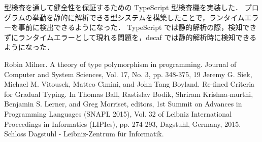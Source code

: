 \documentclass[11pt,twocolumn]{classes/yokou}
\begin{document}
型検査を通して健全性を保証するための TypeScript 型検査機を実装した．
プログラムの挙動を静的に解析できる型システムを構築したことで，ランタイムエラーを事前に検出できるようになった．
TypeScript では静的解析の際，検知できずにランタイムエラーとして現れる問題を，decaf では静的解析時に検知できるようになった．

\begin{thebibliography}{9}
	\bibitem{} Robin Milner. A theory of type polymorphism in programming. Journal of Computer and System Sciences, Vol. 17, No. 3, pp. 348-375, 19
	\bibitem{} Jeremy G. Siek, Michael M. Vitousek, Matteo Cimini, and John Tang Boyland. Re-fined Criteria for Gradual Typing. In Thomas Ball, Rastislav Bodík, Shriram Krishna-murthi, Benjamin S. Lerner, and Greg Morriset, editors, 1st Summit on Advances in Programming Languages (SNAPL 2015), Vol. 32 of Leibniz International Proceedings in Informatics (LIPIcs), pp. 274-293, Dagstuhl, Germany, 2015. Schloss Dagstuhl - Leibniz-Zentrum für Informatik.
\end{thebibliography}
\end{document}

